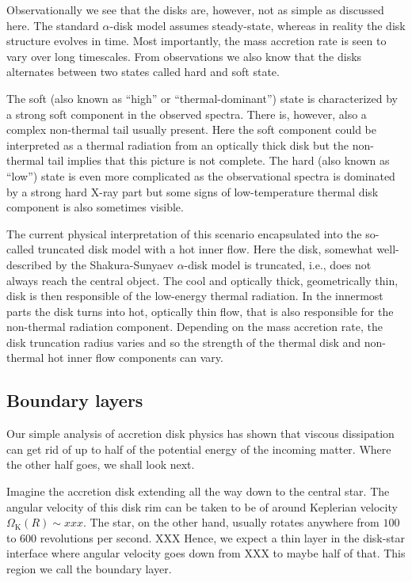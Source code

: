 Observationally we see that the disks are, however, not as simple as discussed here.\cite[see][,for a review]{DGK07}
The standard $\alpha$-disk model assumes steady-state, whereas in reality the disk structure evolves in time.
Most importantly, the mass accretion rate is seen to vary over long timescales.
From observations we also know that the disks alternates between two states called hard and soft state.\cite{Mitsuda89, HvdK89, GD02, MC03, MDF14, DGK07}

The soft (also known as ``high'' or ``thermal-dominant'') state is characterized by a strong soft component in the observed spectra.\cite{GZP99}
There is, however, also a complex non-thermal tail usually present.\cite{MRC00}
Here the soft component could be interpreted as a thermal radiation from an optically thick disk but the non-thermal tail implies that this picture is not complete.
The hard (also known as ``low'') state is even more complicated as the observational spectra is dominated by a strong hard X-ray part but some signs of low-temperature thermal disk component is also sometimes visible.\cite[see, e.g.,][]{ZG04}

The current physical interpretation of this scenario encapsulated into the so-called truncated disk model with a hot inner flow.
Here the disk, somewhat well-described by the Shakura-Sunyaev $\alpha$-disk model is truncated, i.e., does not always reach the central object.
The cool and optically thick, geometrically thin, disk is then responsible of the low-energy thermal radiation.
In the innermost parts the disk turns into hot, optically thin flow, that is also responsible for the non-thermal radiation component.
Depending on the mass accretion rate, the disk truncation radius varies and so the strength of the thermal disk and non-thermal hot inner flow components can vary.



\subsection{Boundary layers}

Our simple analysis of accretion disk physics has shown that viscous dissipation can get rid of up to half of the potential energy of the incoming matter.
Where the other half goes, we shall look next.

Imagine the accretion disk extending all the way down to the central star.
The angular velocity of this disk rim can be taken to be of around Keplerian velocity $\Omega_{\mathrm{K}}(R) \sim xxx$.
The star, on the other hand, usually rotates anywhere from $100$ to $600$ revolutions per second. XXX
Hence, we expect a thin layer in the disk-star interface where angular velocity goes down from XXX to maybe half of that.
This region we call the boundary layer.

